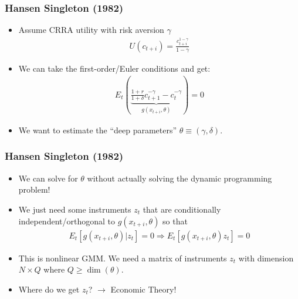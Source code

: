 \documentclass[xcolor=pdftex,dvipsnames,table,mathserif,aspectratio=169]{beamer}
\begin{document}
\begin{frame}
\frametitle{Hansen Singleton (1982)}
\begin{itemize}
\item Assume CRRA utility with risk aversion $\gamma$
\begin{eqnarray*}
U(c_{t+i})  = \frac{c_{t+i}^{1-\gamma}}{1-\gamma}
\end{eqnarray*}
\item We can take the first-order/Euler conditions and get:
\begin{eqnarray*}
E_t \left(\underbrace{\frac{1+r}{1+\delta} c_{t+1}^{-\gamma} - c_{t}^{-\gamma}}_{g(x_{t+i},\theta)}\right) = 0
\end{eqnarray*}
\item We want to estimate the ``deep parameters'' $\theta \equiv (\gamma,\delta)$.
\end{itemize}
\end{frame}

\begin{frame}
\frametitle{Hansen Singleton (1982)}
\begin{itemize}
\item We can solve for $\theta$ without actually solving the dynamic programming problem!
\item We just need some instruments $z_t$ that are conditionally independent/orthogonal to $g(x_{t+i},\theta)$ so that
\begin{eqnarray*}
E_t [g(x_{t+i},\theta) | z_t] = 0 \Rightarrow E_t [g(x_{t+i},\theta)  z_t] = 0 
\end{eqnarray*}
\item This is \alert{nonlinear GMM}. We need a matrix of instruments $z_t$ with dimension $N \times Q$ where $Q \geq \dim(\theta)$.
\item Where do we get $z_t$? $\rightarrow$ Economic Theory!
\end{itemize}
\end{frame}
\end{document}
